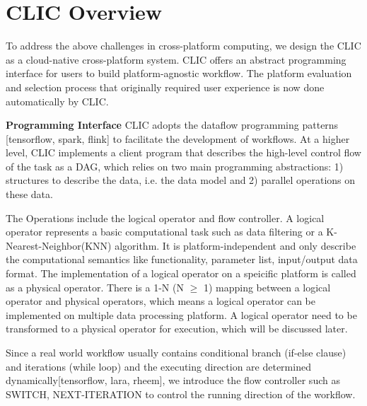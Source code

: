 \section{CLIC Overview}
To address the above challenges in cross-platform computing, we design the CLIC as a cloud-native cross-platform system. 
CLIC offers an abstract programming interface for users to build platform-agnostic workflow.
The platform evaluation and selection process that originally required user experience is now done automatically by CLIC.

\textbf{Programming Interface} 
CLIC adopts the dataflow programming patterns [tensorflow, spark, flink] to facilitate the development of workflows. 
At a higher level, CLIC implements a client program that describes the high-level control flow of the task as a DAG, which relies on two main programming abstractions:
1) structures to describe the data, i.e. the data model and 2) parallel operations on these data.

The Operations include the logical operator and flow controller. 
A logical operator represents a basic computational task such as data filtering or a K-Nearest-Neighbor(KNN) algorithm.
It is platform-independent and only describe the computational semantics like functionality, parameter list, input/output data format.
The implementation of a logical operator on a speicific platform is called as a physical operator.
There is a 1-N (N $\ge$ 1) mapping between a logical operator and physical operators, which means a logical operator can be implemented on multiple data processing platform.
A logical operator need to be transformed to a physical operator for execution, which will be discussed later.

Since a real world workflow usually contains conditional branch (if-else clause) and iterations (while loop)
and the executing direction are determined dynamically[tensorflow, lara, rheem], 
we introduce the flow controller such as SWITCH, NEXT-ITERATION to control the running direction of the workflow. 


